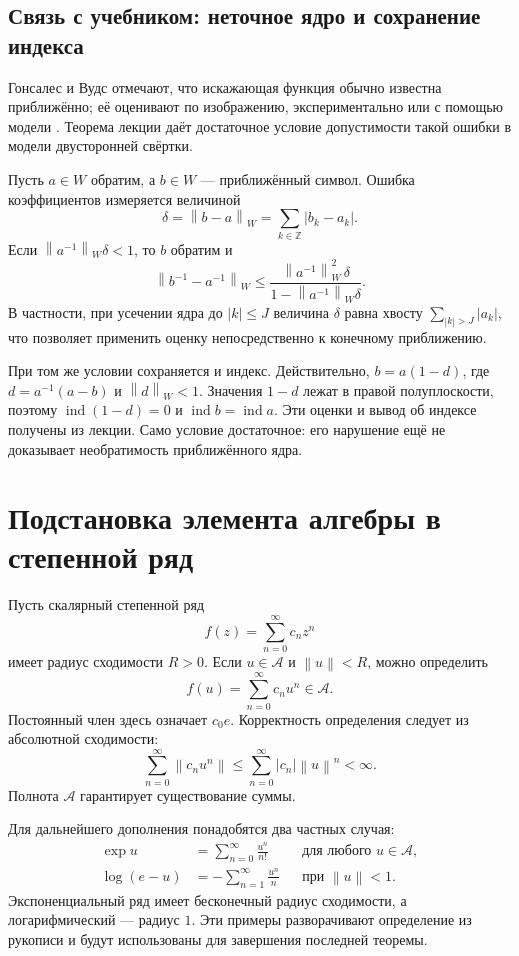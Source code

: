 \documentclass[12pt,a4paper]{article}
\theoremstyle{definition}
\theoremstyle{remark}
\newcommand{\ZZ}{\mathbb{Z}}
\newcommand{\norm}[1]{\left\lVert #1\right\rVert}
\DeclareMathOperator{\ind}{ind}
\begin{document}
\subsection{Связь с учебником: неточное ядро и сохранение индекса}

Гонсалес и Вудс отмечают, что искажающая функция обычно известна
приближённо; её оценивают по изображению, экспериментально или
с помощью модели \cite[\S\,5.6, с.~407--408]{GW2012}.
Теорема лекции даёт достаточное условие допустимости такой ошибки
в модели двусторонней свёртки.

Пусть $a\in W$ обратим, а $b\in W$ --- приближённый символ. Ошибка
коэффициентов измеряется величиной
\[
  \delta=\norm{b-a}_W=\sum_{k\in\ZZ}|b_k-a_k|.
\]
Если $\norm{a^{-1}}_W\delta<1$, то $b$ обратим и
\[
  \norm{b^{-1}-a^{-1}}_W
  \leqslant
  \frac{\norm{a^{-1}}_W^2\,\delta}
       {1-\norm{a^{-1}}_W\delta}.
\]
В частности, при усечении ядра до $|k|\leqslant J$ величина $\delta$
равна хвосту $\sum_{|k|>J}|a_k|$, что позволяет применить оценку
непосредственно к конечному приближению.

При том же условии сохраняется и индекс. Действительно,
$b=a(1-d)$, где $d=a^{-1}(a-b)$ и $\norm{d}_W<1$.
Значения $1-d$ лежат в правой полуплоскости, поэтому
$\ind(1-d)=0$ и $\ind b=\ind a$.
Эти оценки и вывод об индексе получены из лекции.
Само условие достаточное: его нарушение ещё не доказывает
необратимость приближённого ядра.

\section{Подстановка элемента алгебры в степенной ряд}

Пусть скалярный степенной ряд
\[
  f(z)=\sum_{n=0}^{\infty}c_nz^n
\]
имеет радиус сходимости $R>0$. Если $u\in\mathcal A$ и $\norm{u}<R$,
можно определить
\[
  \boxed{f(u)=\sum_{n=0}^{\infty}c_nu^n\in\mathcal A}.
\]
Постоянный член здесь означает $c_0e$. Корректность определения
следует из абсолютной сходимости:
\[
  \sum_{n=0}^{\infty}\norm{c_nu^n}
  \leqslant\sum_{n=0}^{\infty}|c_n|\norm{u}^n<\infty.
\]
Полнота $\mathcal A$ гарантирует существование суммы.

Для дальнейшего дополнения понадобятся два частных случая:
\begin{align*}
  \exp u&=\sum_{n=0}^{\infty}\frac{u^n}{n!}
       &&\text{для любого }u\in\mathcal A,\\
  \log(e-u)&=-\sum_{n=1}^{\infty}\frac{u^n}{n}
       &&\text{при }\norm{u}<1.
\end{align*}
Экспоненциальный ряд имеет бесконечный радиус сходимости, а
логарифмический --- радиус $1$. Эти примеры разворачивают определение
из рукописи и будут использованы для завершения последней теоремы.
\end{document}
